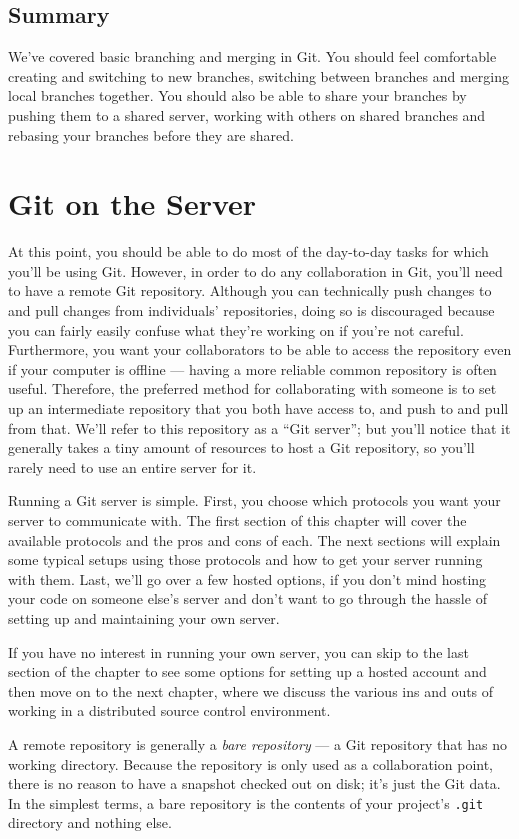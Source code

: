 \documentclass[a4paper]{book}
\newcounter{tab}[chapter]
\newcommand{\chap}[1]{\newpage\thispagestyle{empty}\chapter{#1}\label{chap:\thechapter}}
\begin{document}
\section{Summary}\label{summary-2}

We've covered basic branching and merging in Git. You should feel comfortable creating and switching to new branches, switching between branches and merging local branches together. You should also be able to share your branches by pushing them to a shared server, working with others on shared branches and rebasing your branches before they are shared.

\chap{Git on the Server}\label{git-on-the-server}

At this point, you should be able to do most of the day-to-day tasks for which you'll be using Git. However, in order to do any collaboration in Git, you'll need to have a remote Git repository. Although you can technically push changes to and pull changes from individuals' repositories, doing so is discouraged because you can fairly easily confuse what they're working on if you're not careful. Furthermore, you want your collaborators to be able to access the repository even if your computer is offline --- having a more reliable common repository is often useful. Therefore, the preferred method for collaborating with someone is to set up an intermediate repository that you both have access to, and push to and pull from that. We'll refer to this repository as a “Git server”; but you'll notice that it generally takes a tiny amount of resources to host a Git repository, so you'll rarely need to use an entire server for it.

Running a Git server is simple. First, you choose which protocols you want your server to communicate with. The first section of this chapter will cover the available protocols and the pros and cons of each. The next sections will explain some typical setups using those protocols and how to get your server running with them. Last, we'll go over a few hosted options, if you don't mind hosting your code on someone else's server and don't want to go through the hassle of setting up and maintaining your own server.

If you have no interest in running your own server, you can skip to the last section of the chapter to see some options for setting up a hosted account and then move on to the next chapter, where we discuss the various ins and outs of working in a distributed source control environment.

A remote repository is generally a \emph{bare repository} --- a Git repository that has no working directory. Because the repository is only used as a collaboration point, there is no reason to have a snapshot checked out on disk; it's just the Git data. In the simplest terms, a bare repository is the contents of your project's \texttt{.git} directory and nothing else.
\end{document}

